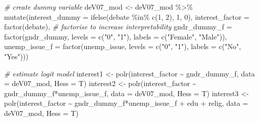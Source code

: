 \documentclass[
]{article}
\newenvironment{Shaded}{\begin{snugshade}}{\end{snugshade}}
\newcommand{\AttributeTok}[1]{\textcolor[rgb]{0.77,0.63,0.00}{#1}}
\newcommand{\CommentTok}[1]{\textcolor[rgb]{0.56,0.35,0.01}{\textit{#1}}}
\newcommand{\DecValTok}[1]{\textcolor[rgb]{0.00,0.00,0.81}{#1}}
\newcommand{\FunctionTok}[1]{\textcolor[rgb]{0.00,0.00,0.00}{#1}}
\newcommand{\NormalTok}[1]{#1}
\newcommand{\OtherTok}[1]{\textcolor[rgb]{0.56,0.35,0.01}{#1}}
\newcommand{\SpecialCharTok}[1]{\textcolor[rgb]{0.00,0.00,0.00}{#1}}
\newcommand{\StringTok}[1]{\textcolor[rgb]{0.31,0.60,0.02}{#1}}
\begin{document}
\begin{Shaded}
\begin{Highlighting}[]
\CommentTok{\# create dummy variable }
\NormalTok{deV07\_mod }\OtherTok{\textless{}{-}}\NormalTok{ deV07\_mod }\SpecialCharTok{\%\textgreater{}\%}
  \FunctionTok{mutate}\NormalTok{(}\AttributeTok{interest\_dummy =} \FunctionTok{ifelse}\NormalTok{(debate }\SpecialCharTok{\%in\%} \FunctionTok{c}\NormalTok{(}\DecValTok{1}\NormalTok{, }\DecValTok{2}\NormalTok{), }\DecValTok{1}\NormalTok{, }\DecValTok{0}\NormalTok{),}
         \AttributeTok{interest\_factor =} \FunctionTok{factor}\NormalTok{(debate),}
         \CommentTok{\# factorise to increase interpretability}
         \AttributeTok{gndr\_dummy\_f =} \FunctionTok{factor}\NormalTok{(gndr\_dummy, }
                               \AttributeTok{levels =} \FunctionTok{c}\NormalTok{(}\StringTok{"0"}\NormalTok{, }\StringTok{"1"}\NormalTok{), }
                               \AttributeTok{labels =} \FunctionTok{c}\NormalTok{(}\StringTok{"Female"}\NormalTok{, }\StringTok{"Male"}\NormalTok{)), }
         \AttributeTok{unemp\_issue\_f =} \FunctionTok{factor}\NormalTok{(unemp\_issue,}
                               \AttributeTok{levels =} \FunctionTok{c}\NormalTok{(}\StringTok{"0"}\NormalTok{, }\StringTok{"1"}\NormalTok{), }
                               \AttributeTok{labels =} \FunctionTok{c}\NormalTok{(}\StringTok{"No"}\NormalTok{, }\StringTok{"Yes"}\NormalTok{)))}

\CommentTok{\# estimate logit model }
\NormalTok{interest1 }\OtherTok{\textless{}{-}} \FunctionTok{polr}\NormalTok{(interest\_factor }\SpecialCharTok{\textasciitilde{}}\NormalTok{ gndr\_dummy\_f, }
                 \AttributeTok{data =}\NormalTok{ deV07\_mod, }
                 \AttributeTok{Hess =}\NormalTok{ T)}
\NormalTok{interest2 }\OtherTok{\textless{}{-}} \FunctionTok{polr}\NormalTok{(interest\_factor }\SpecialCharTok{\textasciitilde{}}\NormalTok{ gndr\_dummy\_f}\SpecialCharTok{*}\NormalTok{unemp\_issue\_f, }
                 \AttributeTok{data =}\NormalTok{ deV07\_mod, }
                 \AttributeTok{Hess =}\NormalTok{ T)}
\NormalTok{interest3 }\OtherTok{\textless{}{-}} \FunctionTok{polr}\NormalTok{(interest\_factor }\SpecialCharTok{\textasciitilde{}}\NormalTok{ gndr\_dummy\_f}\SpecialCharTok{*}\NormalTok{unemp\_issue\_f }\SpecialCharTok{+}\NormalTok{ edu }\SpecialCharTok{+}\NormalTok{ relig, }
                 \AttributeTok{data =}\NormalTok{ deV07\_mod, }
                 \AttributeTok{Hess =}\NormalTok{ T)}


\end{Highlighting}
\end{Shaded}
\end{document}
